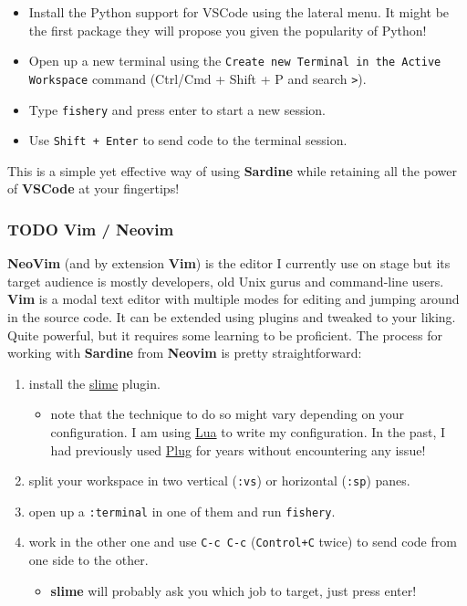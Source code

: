\documentclass[11pt]{article}
\begin{document}
\begin{itemize}
\item Install the Python support for VSCode using the lateral menu. It might be the first package they will propose you given the popularity of Python!
\item Open up a new terminal using the \texttt{Create new Terminal in the Active Workspace} command (Ctrl/Cmd + Shift + P and search \texttt{>}).
\item Type \texttt{fishery} and press enter to start a new session.
\item Use \texttt{Shift + Enter} to send code to the terminal session.
\end{itemize}

This is a simple yet effective way of using \textbf{Sardine} while retaining all the power of \textbf{VSCode} at your fingertips!

\subsubsection{{\bfseries\sffamily TODO} Vim / Neovim}
\label{sec:org53bba4a}

\textbf{NeoVim} (and by extension \textbf{Vim}) is the editor I currently use on stage but its target audience is mostly developers, old Unix gurus and command-line users. \textbf{Vim} is a modal text editor with multiple modes for editing and jumping around in the source code. It can be extended using plugins and tweaked to your liking. Quite powerful, but it requires some learning to be proficient. The process for working with \textbf{Sardine} from \textbf{Neovim} is pretty straightforward:

\begin{enumerate}
\item install the \href{https://github.com/jpalardy/vim-slime}{slime} plugin.
\begin{itemize}
\item note that the technique to do so might vary depending on your configuration. I am using \href{https://github.com/nanotee/nvim-lua-guide}{Lua} to write my configuration. In the past, I had previously used \href{https://github.com/junegunn/vim-plug}{Plug} for years without encountering any issue!
\end{itemize}
\item split your workspace in two vertical (\texttt{:vs}) or horizontal (\texttt{:sp}) panes.
\item open up a \texttt{:terminal} in one of them and run \texttt{fishery}.
\item work in the other one and use \texttt{C-c C-c} (\texttt{Control+C} twice) to send code from one side to the other.
\begin{itemize}
\item \textbf{slime} will probably ask you which job to target, just press enter!
\end{itemize}
\end{enumerate}
\end{document}
